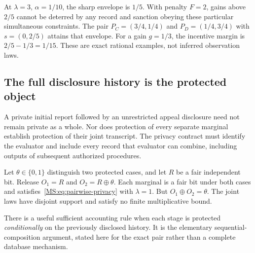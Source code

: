 At $\lambda=3$, $\alpha=1/10$, the sharp envelope is $1/5$. With penalty $F=2$, gains above $2/5$ cannot be deterred by any record and sanction obeying these particular simultaneous constraints. The pair $P_C=(3/4,1/4)$ and $P_D=(1/4,3/4)$ with $s=(0,2/5)$ attains that envelope. For a gain $g=1/3$, the incentive margin is $2/5-1/3=1/15$. These are exact rational examples, not inferred observation laws.

\subsection{The full disclosure history is the protected object}\label{MS:sec:disclosure-history}

A private initial report followed by an unrestricted appeal disclosure need not remain private as a whole. Nor does protection of every separate marginal establish protection of their joint transcript. The privacy contract must identify the evaluator and include every record that evaluator can combine, including outputs of subsequent authorized procedures.

\begin{MScounterexample}\label{MS:ex:privacy-marginals}
Let $\theta\in\{0,1\}$ distinguish two protected cases, and let $R$ be a fair independent bit. Release $O_1=R$ and $O_2=R\oplus\theta$. Each marginal is a fair bit under both cases and satisfies~\eqref{MS:eq:pairwise-privacy} with $\lambda=1$. But $O_1\oplus O_2=\theta$. The joint laws have disjoint support and satisfy no finite multiplicative bound.
\end{MScounterexample}

There is a useful sufficient accounting rule when each stage is protected \emph{conditionally} on the previously disclosed history. It is the elementary sequential-composition argument, stated here for the exact pair rather than a complete database mechanism.

